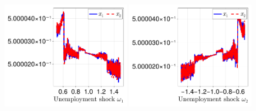 \documentclass[12pt,a4paper]{article}
\begin{document}
\begin{figure}[H]
\centering
\includegraphics[width=0.49\textwidth]{figures/V9/γ=1.0-μ_0=0.5-α=0.0/fig_optimal_x_by_ω_1.pdf}
\includegraphics[width=0.49\textwidth]{figures/V9/γ=1.0-μ_0=0.5-α=0.0/fig_optimal_x_by_ω_2.pdf}
\end{figure}

\end{document}
